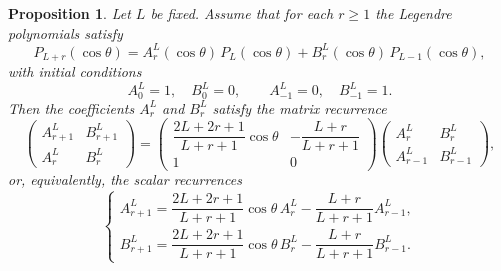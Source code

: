 \documentclass[11pt]{article}
\newtheorem{prop}[thm]{Proposition}
\theoremstyle{definition}
\theoremstyle{remark}
\numberwithin{equation}{section}
\begin{document}
\begin{prop}
Let $L$ be fixed. Assume that for each $r \geq 1$ the Legendre polynomials satisfy
\[
P_{L+r}(\cos\theta)
= A_r^L(\cos\theta)\, P_L(\cos\theta)
+ B_r^L(\cos\theta)\, P_{L-1}(\cos\theta),
\]
with initial conditions
\[
A_0^L = 1, \quad B_0^L = 0, \qquad
A_{-1}^L = 0, \quad B_{-1}^L = 1.
\]
Then the coefficients $A_r^L$ and $B_r^L$ satisfy the matrix recurrence
\[
\begin{pmatrix}
A_{r+1}^L & B_{r+1}^L \\
A_r^L & B_r^L
\end{pmatrix}
=
\begin{pmatrix}
\dfrac{2L+2r+1}{L+r+1}\cos\theta &
-\dfrac{L+r}{L+r+1} \\
1 & 0
\end{pmatrix}
\begin{pmatrix}
A_r^L & B_r^L \\
A_{r-1}^L & B_{r-1}^L
\end{pmatrix},
\]
or, equivalently, the scalar recurrences
\[
\begin{cases}
A_{r+1}^L
= \dfrac{2L+2r+1}{L+r+1}\cos\theta\, A_r^L
- \dfrac{L+r}{L+r+1} A_{r-1}^L, \\[0.8em]
B_{r+1}^L
= \dfrac{2L+2r+1}{L+r+1}\cos\theta\, B_r^L
- \dfrac{L+r}{L+r+1} B_{r-1}^L.
\end{cases}
\]
\end{prop}
\end{document}
